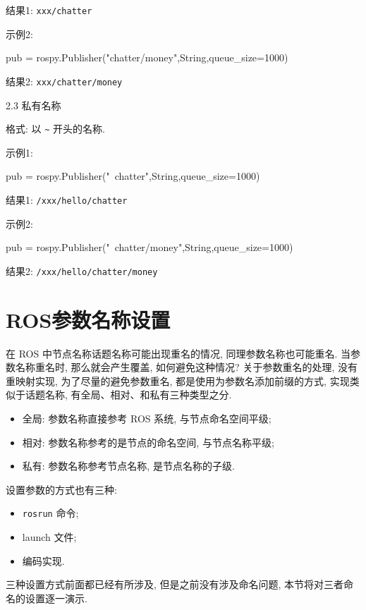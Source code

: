 \documentclass[openany, fontset=windowsold]{ctexbook}
\theoremstyle{kaiti}
\theoremstyle{normal}
\begin{document}
结果1: \verb|xxx/chatter|

示例2: 

\begin{python}
pub = rospy.Publisher("chatter/money",String,queue_size=1000)
\end{python}

结果2: \verb|xxx/chatter/money|

2.3 私有名称

格式: 以 \verb|~| 开头的名称.

示例1:

\begin{python}
pub = rospy.Publisher("~chatter",String,queue_size=1000)
\end{python}

结果1: \verb|/xxx/hello/chatter|

示例2:

\begin{python}
pub = rospy.Publisher("~chatter/money",String,queue_size=1000)
\end{python}

结果2: \verb|/xxx/hello/chatter/money|

\section{ROS参数名称设置}

在 ROS 中节点名称话题名称可能出现重名的情况, 同理参数名称也可能重名. 当参数名称重名时, 那么就会产生覆盖, 如何避免这种情况? 关于参数重名的处理, 没有重映射实现, 为了尽量的避免参数重名, 都是使用为参数名添加前缀的方式, 实现类似于话题名称, 有全局、相对、和私有三种类型之分.

\begin{itemize}
  \item 全局: 参数名称直接参考 ROS 系统, 与节点命名空间平级;
  \item 相对: 参数名称参考的是节点的命名空间, 与节点名称平级;
  \item 私有: 参数名称参考节点名称, 是节点名称的子级.
\end{itemize}

设置参数的方式也有三种:

\begin{itemize}
  \item \verb|rosrun| 命令;
  \item launch 文件;
  \item 编码实现.
\end{itemize}

三种设置方式前面都已经有所涉及, 但是之前没有涉及命名问题, 本节将对三者命名的设置逐一演示.
\end{document}
